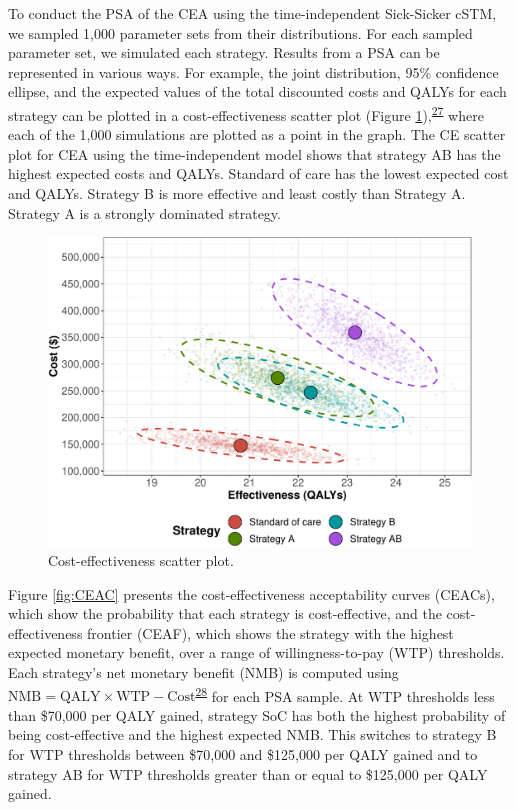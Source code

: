 \documentclass[
]{article}
\begin{document}
To conduct the PSA of the CEA using the time-independent Sick-Sicker cSTM, we sampled 1,000 parameter sets from their distributions. For each sampled parameter set, we simulated each strategy. Results from a PSA can be represented in various ways. For example, the joint distribution, 95\% confidence ellipse, and the expected values of the total discounted costs and QALYs for each strategy can be plotted in a cost-effectiveness scatter plot (Figure \ref{fig:CE-scatter}),\textsuperscript{\protect\hyperlink{ref-Briggs2002}{27}} where each of the 1,000 simulations are plotted as a point in the graph. The CE scatter plot for CEA using the time-independent model shows that strategy AB has the highest expected costs and QALYs. Standard of care has the lowest expected cost and QALYs. Strategy B is more effective and least costly than Strategy A. Strategy A is a strongly dominated strategy.

\begin{figure}[H]

{\centering \includegraphics{figs/CE-scatter-1} 

}

\caption{Cost-effectiveness scatter plot.}\label{fig:CE-scatter}
\end{figure}

Figure \ref{fig:CEAC} presents the cost-effectiveness acceptability curves (CEACs), which show the probability that each strategy is cost-effective, and the cost-effectiveness frontier (CEAF), which shows the strategy with the highest expected monetary benefit, over a range of willingness-to-pay (WTP) thresholds. Each strategy's net monetary benefit (NMB) is computed using \(\text{NMB} = \text{QALY} \times \text{WTP} - \text{Cost}\)\textsuperscript{\protect\hyperlink{ref-Stinnett1998b}{28}} for each PSA sample. At WTP thresholds less than \$70,000 per QALY gained, strategy SoC has both the highest probability of being cost-effective and the highest expected NMB. This switches to strategy B for WTP thresholds between \$70,000 and \$125,000 per QALY gained and to strategy AB for WTP thresholds greater than or equal to \$125,000 per QALY gained.
\end{document}
